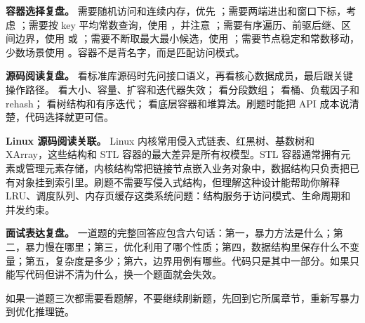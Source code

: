 \textbf{\cpp 容器选择复盘。} 需要随机访问和连续内存，优先 ；需要两端进出和窗口下标，考虑 ；需要按 key 平均常数查询，使用 ，并注意 ；需要有序遍历、前驱后继、区间边界，使用  或 ；需要不断取最大最小候选，使用 ；需要节点稳定和常数移动，少数场景使用 。容器不是背名字，而是匹配访问模式。

\textbf{源码阅读复盘。} 看标准库源码时先问接口语义，再看核心数据成员，最后跟关键操作路径。  看大小、容量、扩容和迭代器失效； 看分段数组； 看桶、负载因子和 rehash； 看树结构和有序迭代； 看底层容器和堆算法。刷题时能把 API 成本说清楚，代码选择就更可信。

\textbf{Linux 源码阅读关联。} Linux 内核常用侵入式链表、红黑树、基数树和 XArray，这些结构和 STL 容器的最大差异是所有权模型。STL 容器通常拥有元素或管理元素存储，内核结构常把链接节点嵌入业务对象中，数据结构只负责把已有对象挂到索引里。刷题不需要写侵入式结构，但理解这种设计能帮助你解释 LRU、调度队列、内存页缓存这类系统问题：结构服务于访问模式、生命周期和并发约束。

\textbf{面试表达复盘。} 一道题的完整回答应包含六句话：第一，暴力方法是什么；第二，暴力慢在哪里；第三，优化利用了哪个性质；第四，数据结构里保存什么不变量；第五，复杂度是多少；第六，边界用例有哪些。代码只是其中一部分。如果只能写代码但讲不清为什么，换一个题面就会失效。

如果一道题三次都需要看题解，不要继续刷新题，先回到它所属章节，重新写暴力到优化推理链。






